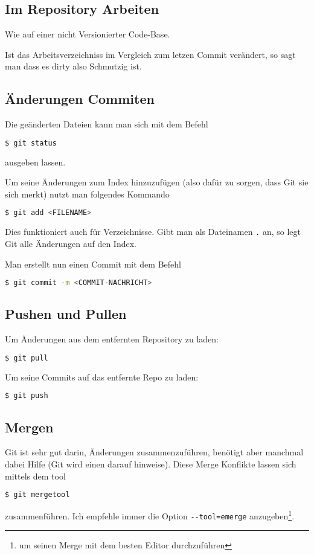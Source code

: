 \documentclass[landscape,a4paper]{cheatsheet}
\newcommand{\highlight}[1]{{\textsf{\color{primaryColor}#1}}}
\begin{document}
\subsection{Im Repository Arbeiten}
Wie auf einer nicht Versionierter Code-Base.

Ist das Arbeitsverzeichniss im Vergleich zum letzen Commit verändert,
so sagt man dass es \highlight{dirty}  also Schmutzig ist.
\subsection{Änderungen \highlight{Commiten}}
Die geänderten Dateien kann man sich mit dem Befehl 
\begin{lstlisting}[language=bash]
  $ git status
\end{lstlisting} %
ausgeben lassen.

Um seine Änderungen zum \highlight{Index} hinzuzufügen (also dafür zu
sorgen, dass Git sie sich merkt) nutzt man folgendes Kommando
\begin{lstlisting}[language=bash]
  $ git add <FILENAME>
\end{lstlisting} %
Dies funktioniert auch für Verzeichnisse. Gibt man als Dateinamen
\lstinline{.} an, so legt Git alle Änderungen auf den Index.

Man erstellt nun einen \highlight{Commit} mit dem Befehl 
\begin{lstlisting}[language=bash]
  $ git commit -m <COMMIT-NACHRICHT>
\end{lstlisting} %

\subsection{\highlight{Pushen} und \highlight{Pullen}}
Um Änderungen aus dem entfernten Repository zu laden:
\begin{lstlisting}[language=bash]
  $ git pull
\end{lstlisting} %

Um seine Commits auf das entfernte Repo zu laden:
\begin{lstlisting}[language=bash]
  $ git push
\end{lstlisting} %

\subsection{\highlight{Mergen}}
Git ist sehr gut darin, Änderungen zusammenzuführen, benötigt aber
manchmal dabei Hilfe (Git wird einen darauf hinweise). Diese
\highlight{Merge Konflikte} lassen sich mittels dem tool
\begin{lstlisting}[language=bash]
  $ git mergetool
\end{lstlisting} %
zusammenführen. Ich empfehle immer die Option
\lstinline{--tool=emerge} anzugeben\footnote{um seinen Merge mit dem
  besten Editor durchzuführen}.
\end{document}
